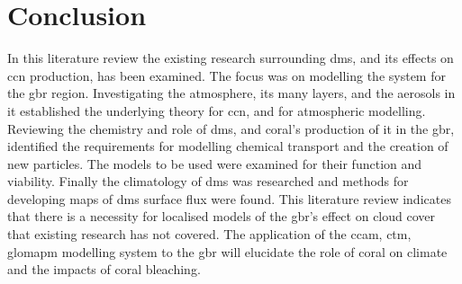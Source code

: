 





\section{Conclusion}
\label{sec:conc}

In this literature review the existing research surrounding \gls{dms}, and its effects on \gls{ccn} production, has been examined. The focus was on modelling the system for the \gls{gbr} region. Investigating the atmosphere, its many layers, and the aerosols in it established the underlying theory for \gls{ccn}, and for atmospheric modelling. Reviewing the chemistry and role of \gls{dms}, and coral's production of it in the \gls{gbr}, identified the requirements for modelling chemical transport and the creation of new particles. The models to be used were examined for their function and viability. Finally the climatology of \gls{dms} was researched and methods for developing maps of \gls{dms} surface flux were found. This literature review indicates that there is a necessity for localised models of the \gls{gbr}'s effect on cloud cover that existing research has not covered. The application of the \gls{ccam}, \gls{ctm}, \gls{glomapm} modelling system to the \gls{gbr} will elucidate the role of coral on climate and the impacts of coral bleaching.



		

	




	

